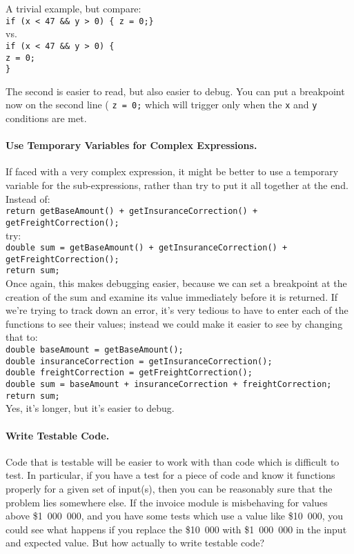 A trivial example, but compare:\\
\texttt{if (x < 47 \&\& y > 0) \{ z = 0;\} }\\
vs.\\
\texttt{if (x < 47 \&\& y > 0) \{\\ \hspace*{0.5cm} z = 0; \\ \} }

The second is easier to read, but also easier to debug. You can put a breakpoint now on the second line ( \texttt{z = 0;} which will trigger only when the \texttt{x} and \texttt{y} conditions are met. 

\paragraph{Use Temporary Variables for Complex Expressions.}
If faced with a very complex expression, it might be better to use a temporary variable for the sub-expressions, rather than try to put it all together at the end. Instead of:\\
\texttt{return getBaseAmount() + getInsuranceCorrection() + getFreightCorrection();}\\
try:\\
\texttt{double sum = getBaseAmount() + getInsuranceCorrection() + getFreightCorrection();\\ return sum;}\\

Once again, this makes debugging easier, because we can set a breakpoint at the creation of the sum and examine its value immediately before it is returned. If we're trying to track down an error, it's very tedious to have to enter each of the functions to see their values; instead we could make it easier to see by changing that to:\\
\texttt{double baseAmount = getBaseAmount();\\
        double insuranceCorrection = getInsuranceCorrection();\\
        double freightCorrection = getFreightCorrection();\\
double sum = baseAmount + insuranceCorrection + freightCorrection;\\ return sum;}\\

Yes, it's longer, but it's easier to debug.

\paragraph{Write Testable Code.} Code that is testable will be easier to work with than code which is difficult to test. In particular, if you have a test for a piece of code and know it functions properly for a given set of input(s), then you can be reasonably sure that the problem lies somewhere else. If the invoice module is misbehaving for values above \$1~000~000, and you have some tests which use a value like \$10~000, you could see what happens if you replace the \$10~000 with \$1~000~000 in the input and expected value. But how actually to write testable code?

